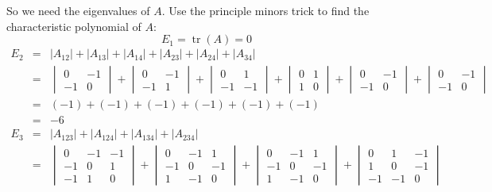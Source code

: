 \documentclass[letterpaper,12pt,fleqn]{article}
\DeclareMathOperator{\tr}{tr}
\begin{document}
\begin{enumerate}
\begin{enumerate}
    So we need the eigenvalues of $A$. Use the principle minors trick to find
    the characteristic polynomial of $A$:
    \[E_1=\tr(A)=0\]
    \begin{eqnarray*}
      E_2 &=& |A_{12}|+|A_{13}|+|A_{14}|+|A_{23}|+|A_{24}|+|A_{34}| \\
      &=& \begin{vmatrix} 0 & -1 \\ -1 & 0 \end{vmatrix}+
      \begin{vmatrix} 0 & -1 \\ -1 & 1 \end{vmatrix}+
      \begin{vmatrix} 0 & 1 \\ -1 & -1 \end{vmatrix}+
      \begin{vmatrix} 0 & 1 \\ 1 & 0 \end{vmatrix}+
      \begin{vmatrix} 0 & -1 \\ -1 & 0 \end{vmatrix}+
      \begin{vmatrix} 0 & -1 \\ -1 & 0 \end{vmatrix} \\
      &=& (-1)+(-1)+(-1)+(-1)+(-1)+(-1) \\
      &=& -6
    \end{eqnarray*}
    \begin{eqnarray*}
      E_3 &=& |A_{123}|+|A_{124}|+|A_{134}|+|A_{234}| \\
      &=& \begin{vmatrix} 0 & -1 & -1 \\ -1 & 0 & 1 \\ -1 & 1 & 0
      \end{vmatrix}+
      \begin{vmatrix} 0 & -1 & 1 \\ -1 & 0 & -1 \\ 1 & -1 & 0
      \end{vmatrix}+
      \begin{vmatrix} 0 & -1 & 1 \\ -1 & 0 & -1 \\ 1 & -1 & 0
      \end{vmatrix}+
      \begin{vmatrix} 0 & 1 & -1 \\ 1 & 0 & -1 \\ -1 & -1 & 0

\end{vmatrix}
\end{eqnarray*}
\end{enumerate}
\end{enumerate}
\end{document}
